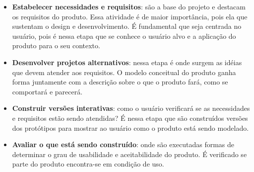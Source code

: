 \begin{itemize}
	\item \textbf{Estabelecer necessidades e requisitos}: são a base do projeto e destacam os requisitos do produto. Essa atividade é de maior importância, pois ela que sustentam o design e desenvolvimento. É fundamental que seja centrada no usuário, pois é nessa etapa que se conhece o usuário alvo e a aplicação do produto para o seu contexto.
	\item \textbf{Desenvolver projetos alternativos}: nessa etapa é onde surgem as idéias que devem atender aos requisitos. O modelo conceitual do produto ganha forma juntamente com a descrição sobre o que o produto fará, como se comportará e parecerá.
	\item \textbf{Construir versões interativas}: como o usuário verificará se as necessidades e requisitos estão sendo atendidas? É nessa etapa que são construídos versões dos protótipos para mostrar ao usuário como o produto está sendo modelado.
	\item \textbf{Avaliar o que está sendo construído}: onde são executadas formas de determinar o grau de usabilidade e aceitabilidade do produto. É verificado se parte do produto encontra-se em condição de uso.
\end{itemize}
